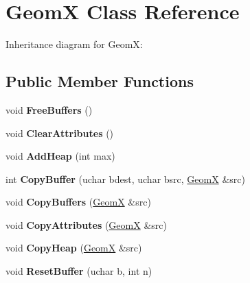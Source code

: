 \hypertarget{class_geom_x}{\section{Geom\+X Class Reference}
\label{class_geom_x}
}


Inheritance diagram for Geom\+X\+:
\subsection*{Public Member Functions}
\begin{DoxyCompactItemize}
\item 
\hypertarget{class_geom_x_a83ab6fd7ddfec1640690e4109bd1c023}{void {\bfseries Free\+Buffers} ()}\label{class_geom_x_a83ab6fd7ddfec1640690e4109bd1c023}

\item 
\hypertarget{class_geom_x_a3d2dde58adbaaad0529ad706f5fcd4c2}{void {\bfseries Clear\+Attributes} ()}\label{class_geom_x_a3d2dde58adbaaad0529ad706f5fcd4c2}

\item 
\hypertarget{class_geom_x_a3efae874ba9b079820f2568801544732}{void {\bfseries Add\+Heap} (int max)}\label{class_geom_x_a3efae874ba9b079820f2568801544732}

\item 
\hypertarget{class_geom_x_a09b9eb67543543c5c630e9aa8a803d97}{int {\bfseries Copy\+Buffer} (uchar bdest, uchar bsrc, \hyperlink{class_geom_x}{Geom\+X} \&src)}\label{class_geom_x_a09b9eb67543543c5c630e9aa8a803d97}

\item 
\hypertarget{class_geom_x_ad02a7c9fbe35aae0a9f4e693b76a78e3}{void {\bfseries Copy\+Buffers} (\hyperlink{class_geom_x}{Geom\+X} \&src)}\label{class_geom_x_ad02a7c9fbe35aae0a9f4e693b76a78e3}

\item 
\hypertarget{class_geom_x_a0e720e31f73d42510a2261a355a6ca19}{void {\bfseries Copy\+Attributes} (\hyperlink{class_geom_x}{Geom\+X} \&src)}\label{class_geom_x_a0e720e31f73d42510a2261a355a6ca19}

\item 
\hypertarget{class_geom_x_ab14a044631059d6c1ad958fd157faff8}{void {\bfseries Copy\+Heap} (\hyperlink{class_geom_x}{Geom\+X} \&src)}\label{class_geom_x_ab14a044631059d6c1ad958fd157faff8}

\item 
\hypertarget{class_geom_x_aba33bb47344560fb36e6fdda223190df}{void {\bfseries Reset\+Buffer} (uchar b, int n)}\label{class_geom_x_aba33bb47344560fb36e6fdda223190df}


\end{DoxyCompactItemize}
